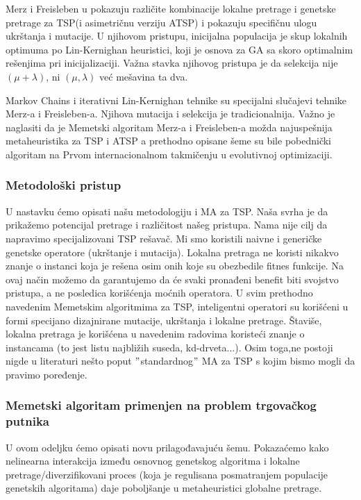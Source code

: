 \documentclass[a4paper]{article}
\begin{document}
Merz i Freisleben u \cite{ASIM} pokazuju različite kombinacije lokalne pretrage i genetske pretrage za TSP(i asimetričnu verziju ATSP) i pokazuju specifičnu ulogu ukrštanja i mutacije. U njihovom pristupu, inicijalna populacija je skup lokalnih optimuma po Lin-Kernighan heuristici, koji je osnova za GA sa skoro optimalnim rešenjima pri inicijalizaciji. Važna stavka njihovog pristupa je da selekcija nije $(\mu +\lambda)$, ni $(\mu,\lambda)$ već mešavina ta dva. 

Markov Chains i iterativni Lin-Kernighan tehnike su specijalni slučajevi tehnike Merz-a i Freisleben-a. Njihova mutacija i selekcija je tradicionalnija. Važno je naglasiti da je Memetski algoritam Merz-a i Freisleben-a možda najuspešnija metaheuristika za TSP i ATSP  a prethodno opisane šeme su bile pobednički algoritam na Prvom internacionalnom takmičenju u evolutivnoj optimizaciji.

\subsubsection{Metodološki pristup}
\label{subsec:metodologija}

U nastavku ćemo opisati našu metodologiju i MA za TSP. Naša svrha je da prikažemo potencijal pretrage i različitost našeg pristupa. Nama nije cilj da napravimo specijalizovani TSP rešavač. Mi smo koristili naivne i generičke genetske operatore (ukrštanje i mutacija). Lokalna pretraga ne koristi nikakvo znanje o instanci koja je rešena osim onih koje su obezbedile fitnes funkcije. Na ovaj način možemo da garantujemo da će svaki pronađeni benefit biti svojstvo pristupa, a ne posledica korišćenja moćnih operatora. U svim prethodno navedenim Memetskim algoritmima za TSP, inteligentni operatori su korišćeni u formi specijano dizajnirane mutacije, ukrštanja i lokalne pretrage. Štaviše, lokalna pretraga je korišćena u navedenim radovima koristeći znanje o instancama (to jest listu najbližih suseda, kd-drveta...). Osim toga,ne postoji nigde u literaturi nešto poput $"$standardnog$"$ MA za TSP s kojim bismo mogli da pravimo poređenje.


\subsubsection{Memetski algoritam primenjen na problem trgovačkog putnika }
\label{subsec:MATSP}

U ovom odeljku ćemo opisati novu prilagođavajuću šemu. Pokazaćemo kako nelinearna interakcija između osnovnog genetskog algoritma i lokalne pretrage/diverzifikovani proces (koja je regulisana posmatranjem populacije genetskih algoritama) daje poboljšanje u metaheuristici globalne pretrage.
\end{document}
